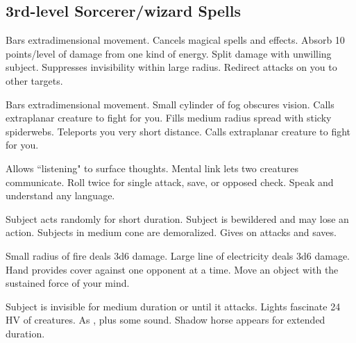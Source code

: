 \subsection{3rd-level Sorcerer/wizard Spells} 
\begin{swspelllist}
   Bars extradimensional movement.
   Cancels magical spells and effects.
   Absorb 10 points/level of damage from one kind of energy.
   Split damage with unwilling subject.
   Suppresses invisibility within large radius.
   Redirect attacks on you to other targets.

   Bars extradimensional movement.
   Small cylinder of fog obscures vision.
   Calls extraplanar creature to fight for you.
   Fills medium radius spread with sticky spiderwebs.
   Teleports you very short distance.
   Calls extraplanar creature to fight for you.

   Allows ``listening" to surface thoughts.
   Mental link lets two creatures communicate.
   Roll twice for single attack, save, or opposed check.
   Speak and understand any language.

   Subject acts randomly for short duration.
   Subject is bewildered and may lose an action.
   Subjects in medium cone are demoralized.
   Gives  on attacks and saves.

   Small radius of fire deals 3d6 damage.
   Large line of electricity deals 3d6 damage.
   Hand provides cover against one opponent at a time.
   Move an object with the sustained force of your mind.

   Subject is invisible for medium duration or until it attacks.
   Lights fascinate 24 HV of creatures.
   As , plus some sound.
   Shadow horse appears for extended duration.


\end{swspelllist}
